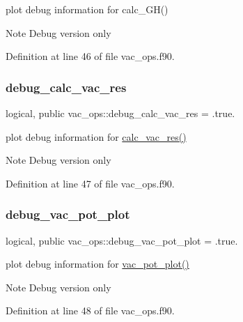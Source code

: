 plot debug information for calc\+\_\+\+G\+H() 

\begin{DoxyNote}{Note}
Debug version only 
\end{DoxyNote}


Definition at line 46 of file vac\+\_\+ops.\+f90.

\mbox{\label{namespacevac__ops_a6b99f921f077f63f641d5a9c86d88eaf}} 
\subsubsection{\texorpdfstring{debug\+\_\+calc\+\_\+vac\+\_\+res}{debug\_calc\_vac\_res}}
{\footnotesize\ttfamily logical, public vac\+\_\+ops\+::debug\+\_\+calc\+\_\+vac\+\_\+res = .true.}



plot debug information for \hyperlink{namespacevac__ops_a5e5a8322b3aa2e3704b1050426f06d9d}{calc\+\_\+vac\+\_\+res()} 

\begin{DoxyNote}{Note}
Debug version only 
\end{DoxyNote}


Definition at line 47 of file vac\+\_\+ops.\+f90.

\mbox{\label{namespacevac__ops_a1afb20e30f5f99547fc8df4ace204ee9}} 
\subsubsection{\texorpdfstring{debug\+\_\+vac\+\_\+pot\+\_\+plot}{debug\_vac\_pot\_plot}}
{\footnotesize\ttfamily logical, public vac\+\_\+ops\+::debug\+\_\+vac\+\_\+pot\+\_\+plot = .true.}



plot debug information for \hyperlink{namespacevac__ops_a3a2a3aed45951aecef42197b82a5a6da}{vac\+\_\+pot\+\_\+plot()} 

\begin{DoxyNote}{Note}
Debug version only 
\end{DoxyNote}


Definition at line 48 of file vac\+\_\+ops.\+f90.

